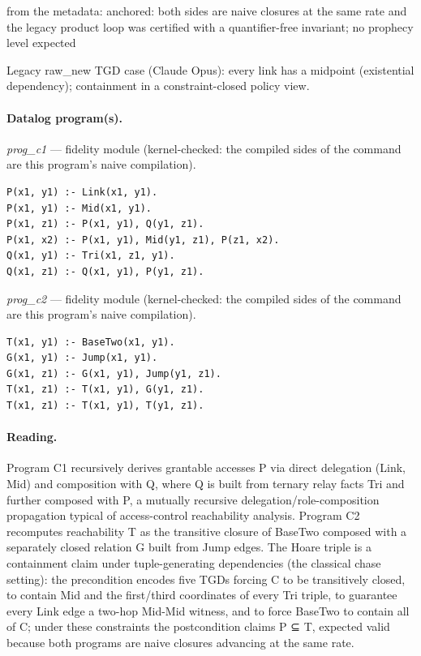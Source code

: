 \documentclass[10pt]{article}
\begin{document}
\begin{description}[leftmargin=2.6cm,style=nextline,itemsep=1pt]
\item[Obstruction note] from the metadata: anchored: both sides are naive closures at the same rate and the legacy product loop was certified with a quantifier-free invariant; no prophecy level expected

\item[Note] Legacy raw\_new TGD case (Claude Opus): every link has a midpoint (existential dependency); containment in a constraint-closed policy view.

\end{description}

\paragraph{Datalog program(s).}

{\raggedright\textit{prog\_c1} --- fidelity module (kernel-checked: the compiled sides of the command are this program's naive compilation).\par}

\begin{Verbatim}[fontsize=\scriptsize,breaklines=true,breakanywhere=true,frame=single,framesep=1.5mm]
P(x1, y1) :- Link(x1, y1).
P(x1, y1) :- Mid(x1, y1).
P(x1, z1) :- P(x1, y1), Q(y1, z1).
P(x1, x2) :- P(x1, y1), Mid(y1, z1), P(z1, x2).
Q(x1, y1) :- Tri(x1, z1, y1).
Q(x1, z1) :- Q(x1, y1), P(y1, z1).
\end{Verbatim}

{\raggedright\textit{prog\_c2} --- fidelity module (kernel-checked: the compiled sides of the command are this program's naive compilation).\par}

\begin{Verbatim}[fontsize=\scriptsize,breaklines=true,breakanywhere=true,frame=single,framesep=1.5mm]
T(x1, y1) :- BaseTwo(x1, y1).
G(x1, y1) :- Jump(x1, y1).
G(x1, z1) :- G(x1, y1), Jump(y1, z1).
T(x1, z1) :- T(x1, y1), G(y1, z1).
T(x1, z1) :- T(x1, y1), T(y1, z1).
\end{Verbatim}

\paragraph{Reading.} Program C1 recursively derives grantable accesses P via direct delegation (Link, Mid) and composition with Q, where Q is built from ternary relay facts Tri and further composed with P, a mutually recursive delegation/role-composition propagation typical of access-control reachability analysis. Program C2 recomputes reachability T as the transitive closure of BaseTwo composed with a separately closed relation G built from Jump edges. The Hoare triple is a containment claim under tuple-generating dependencies (the classical chase setting): the precondition encodes five TGDs forcing C to be transitively closed, to contain Mid and the first/third coordinates of every Tri triple, to guarantee every Link edge a two-hop Mid-Mid witness, and to force BaseTwo to contain all of C; under these constraints the postcondition claims P ⊆ T, expected valid because both programs are naive closures advancing at the same rate.
\end{document}
